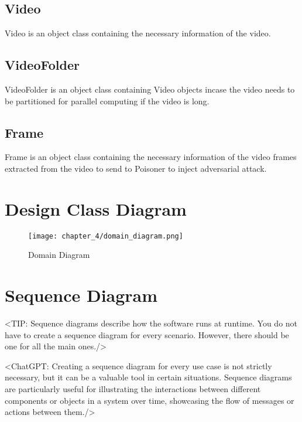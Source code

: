 \subsection{Video}
Video is an object class containing the necessary information of the video.

\subsection{VideoFolder}
VideoFolder is an object class containing Video objects incase the video needs to be partitioned for parallel computing if the video is long.

\subsection{Frame}
Frame is an object class containing the necessary information of the video frames extracted from the video to send to Poisoner to inject adversarial attack.


\section{Design Class Diagram}
\label{section:design-class-diagram}
\begin{figure}[h]
    \centering
    \texttt{[image: chapter\_4/domain\_diagram.png]}
    \caption{Domain Diagram}
    \label{fig:domain-model}
\end{figure}

\section{Sequence Diagram}
\label{section:sequence-diagram}
<TIP: Sequence diagrams describe how the software runs at runtime.
You do not have to create a sequence diagram for every scenario. However,
there should be one for all the main ones./>

<ChatGPT: Creating a sequence diagram for every use case is not
strictly necessary, but it can be a valuable tool in certain situations. Sequence
diagrams are particularly useful for illustrating the interactions between different
components or objects in a system over time, showcasing the flow of messages
or actions between them./>